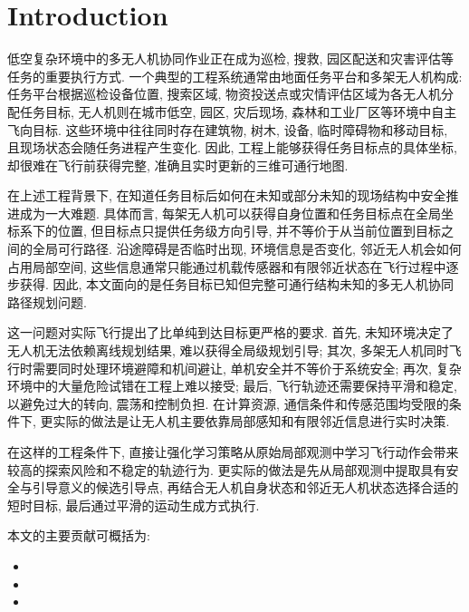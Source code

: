 



\section{Introduction}
\label{sec1}
低空复杂环境中的多无人机协同作业正在成为巡检, 搜救, 园区配送和灾害评估等任务的重要执行方式. 一个典型的工程系统通常由地面任务平台和多架无人机构成: 任务平台根据巡检设备位置, 搜索区域, 物资投送点或灾情评估区域为各无人机分配任务目标, 无人机则在城市低空, 园区, 灾后现场, 森林和工业厂区等环境中自主飞向目标. 这些环境中往往同时存在建筑物, 树木, 设备, 临时障碍物和移动目标, 且现场状态会随任务进程产生变化. 因此, 工程上能够获得任务目标点的具体坐标, 却很难在飞行前获得完整, 准确且实时更新的三维可通行地图.

在上述工程背景下, 在知道任务目标后如何在未知或部分未知的现场结构中安全推进成为一大难题. 具体而言, 每架无人机可以获得自身位置和任务目标点在全局坐标系下的位置, 但目标点只提供任务级方向引导, 并不等价于从当前位置到目标之间的全局可行路径. 沿途障碍是否临时出现, 环境信息是否变化, 邻近无人机会如何占用局部空间, 这些信息通常只能通过机载传感器和有限邻近状态在飞行过程中逐步获得. 因此, 本文面向的是任务目标已知但完整可通行结构未知的多无人机协同路径规划问题.

这一问题对实际飞行提出了比单纯到达目标更严格的要求. 首先, 未知环境决定了无人机无法依赖离线规划结果, 难以获得全局级规划引导; 其次, 多架无人机同时飞行时需要同时处理环境避障和机间避让, 单机安全并不等价于系统安全; 再次, 复杂环境中的大量危险试错在工程上难以接受; 最后, 飞行轨迹还需要保持平滑和稳定, 以避免过大的转向, 震荡和控制负担. 在计算资源, 通信条件和传感范围均受限的条件下, 更实际的做法是让无人机主要依靠局部感知和有限邻近信息进行实时决策.

在这样的工程条件下, 直接让强化学习策略从原始局部观测中学习飞行动作会带来较高的探索风险和不稳定的轨迹行为. 更实际的做法是先从局部观测中提取具有安全与引导意义的候选引导点, 再结合无人机自身状态和邻近无人机状态选择合适的短时目标, 最后通过平滑的运动生成方式执行. 



本文的主要贡献可概括为:
\begin{itemize}
  \item 
  \item 
  \item 
\end{itemize}

